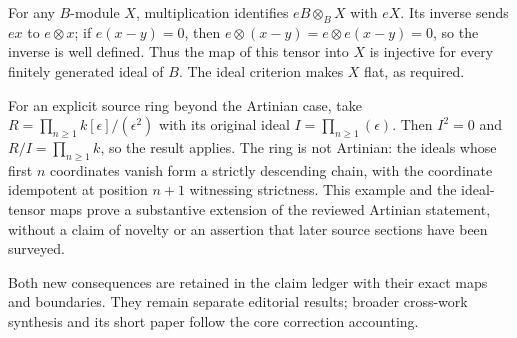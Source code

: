 For any \(B\)-module \(X\), multiplication identifies \(eB\otimes_BX\) with \(eX\). Its inverse sends \(ex\) to \(e\otimes x\); if \(e(x-y)=0\), then \(e\otimes(x-y)=e\otimes e(x-y)=0\), so the inverse is well defined. Thus the map of this tensor into \(X\) is injective for every finitely generated ideal of \(B\). The ideal criterion makes \(X\) flat, as required.

For an explicit source ring beyond the Artinian case, take \(R=\prod_{n\geq1}k[\epsilon]/(\epsilon^2)\) with its original ideal \(I=\prod_{n\geq1}(\epsilon)\). Then \(I^2=0\) and \(R/I=\prod_{n\geq1}k\), so the result applies. The ring is not Artinian: the ideals whose first \(n\) coordinates vanish form a strictly descending chain, with the coordinate idempotent at position \(n+1\) witnessing strictness. This example and the ideal-tensor maps prove a substantive extension of the reviewed Artinian statement, without a claim of novelty or an assertion that later source sections have been surveyed.

Both new consequences are retained in the claim ledger with their exact maps and boundaries. They remain separate editorial results; broader cross-work synthesis and its short paper follow the core correction accounting.
